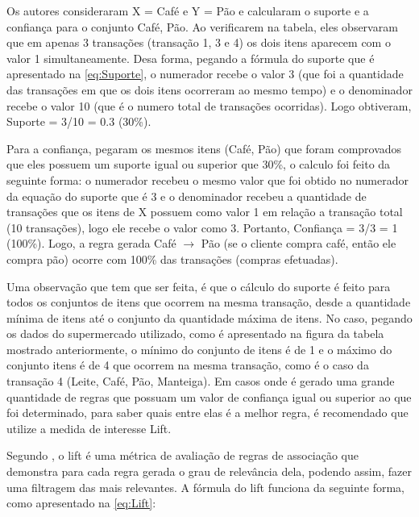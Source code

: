 \par
Os autores  consideraram X = {Café} e Y = {Pão} e calcularam o suporte e a confiança para o conjunto {Café, Pão}. Ao verificarem na tabela, eles observaram que em apenas 3 transações (transação 1, 3 e 4) os dois itens aparecem com o valor 1 simultaneamente. Desa forma, pegando a fórmula do suporte que é apresentado na \autoref{eq:Suporte}, o numerador recebe o valor 3 (que foi a quantidade das transações em que os dois itens ocorreram ao mesmo tempo) e o denominador recebe o valor 10 (que é o numero total de transações ocorridas). Logo obtiveram, Suporte = 3/10 = 0.3 (30\%).

\par
Para a confiança,  pegaram os mesmos itens (Café, Pão) que foram comprovados que eles possuem um suporte igual ou superior que 30\%, o calculo foi feito da seguinte forma: o numerador recebeu o mesmo valor que foi obtido no numerador da equação do suporte que é 3 e o denominador recebeu a quantidade de transações que os itens de X possuem como valor 1 em relação a transação total (10 transações), logo ele recebe o valor como 3. Portanto, Confiança = 3/3 = 1 (100\%). Logo, a regra gerada Café $\rightarrow$ Pão (se o cliente compra café, então ele compra pão) ocorre com 100\% das transações (compras efetuadas).

\par
Uma observação que tem que ser feita, é que o cálculo do suporte é feito para todos os conjuntos de itens que ocorrem na mesma transação, desde a quantidade mínima de itens até o conjunto da quantidade máxima de itens. No caso, pegando os dados do supermercado utilizado, como é apresentado na figura da tabela mostrado anteriormente, o mínimo do conjunto de itens é de 1 e o máximo do conjunto itens é de 4 que ocorrem na mesma transação, como é o caso da transação 4 (Leite, Café, Pão, Manteiga). Em casos onde é gerado uma grande quantidade de regras que possuam um valor de confiança igual ou superior ao que foi determinado, para saber quais entre elas é a melhor regra, é recomendado que utilize a medida de interesse Lift.

\par
Segundo , o lift é uma métrica de avaliação de regras de associação que demonstra para cada regra gerada o grau de relevância dela, podendo assim, fazer uma filtragem das mais relevantes. A fórmula do lift funciona da seguinte forma, como apresentado na \autoref{eq:Lift}:

